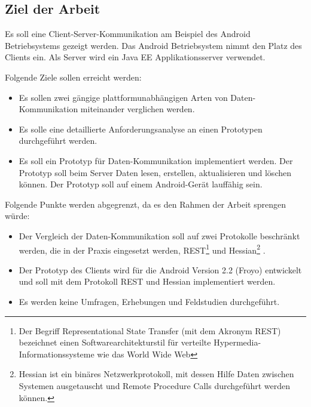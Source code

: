 \documentclass[listof=totoc,bibliography=totoc]{scrreprt}
\begin{document}
  \subsection{Ziel der Arbeit}
  Es soll eine Client-Server-Kommunikation am Beispiel des Android
  Betriebsystems gezeigt werden. Das Android Betriebsystem nimmt den
  Platz des Clients ein. Als Server wird ein Java EE Applikationsserver
  verwendet.\newline
  
  Folgende Ziele sollen erreicht werden:
  
  \begin{itemize}
      \item Es sollen zwei gängige plattformunabhängigen Arten von
          Daten-Kommunikation miteinander verglichen werden.
      \item Es solle eine detaillierte Anforderungsanalyse an einen
          Prototypen durchgeführt werden.
      \item Es soll ein Prototyp für Daten-Kommunikation implementiert
          werden. Der Prototyp soll beim Server Daten lesen, erstellen,
          aktualisieren und löschen können. Der Prototyp soll auf einem
          Android-Gerät lauffähig sein.
  \end{itemize}
  
  Folgende Punkte werden abgegrenzt, da es den Rahmen der Arbeit sprengen 
  würde:
  
  \begin{itemize}
      \item Der Vergleich der Daten-Kommunikation soll auf zwei Protokolle
          beschränkt werden, die in der Praxis eingesetzt werden,
          REST\footnote{
              Der Begriff Representational State Transfer (mit dem Akronym
              REST) bezeichnet einen Softwarearchitekturstil für verteilte
              Hypermedia-Informationssysteme wie das World Wide Web}
          und Hessian\footnote{
              Hessian ist ein binäres Netzwerkprotokoll, mit dessen Hilfe
              Daten zwischen Systemen ausgetauscht und Remote Procedure Calls
              durchgeführt werden können.}
          .
      \item Der Prototyp des Clients wird für die Android Version 2.2 (Froyo)
          entwickelt und soll mit dem Protokoll REST und Hessian
          implementiert werden.
      \item Es werden keine Umfragen, Erhebungen und Feldstudien
          durchgeführt.
  \end{itemize}
  
\end{document}
